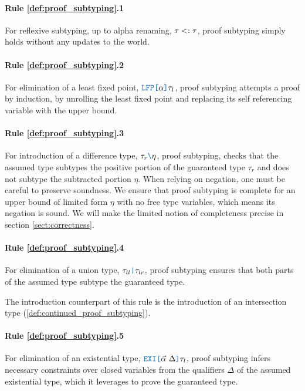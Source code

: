 \documentclass[acmsmall]{acmart}
\theoremstyle{definition}
\begin{document}
\paragraph{Rule \ref{def:proof_subtyping}.1}
For reflexive subtyping, up to alpha renaming, $\tau <: \tau$, 
proof subtyping simply holds without any updates to the world.

\paragraph{Rule \ref{def:proof_subtyping}.2}
For elimination of a least fixed point, $\obj{LFP[} \alpha \obj{]} \tau_l$, proof subtyping  
attempts a proof by induction, by unrolling the least fixed point
and replacing its self referencing variable with the upper bound.

\paragraph{Rule \ref{def:proof_subtyping}.3}
For introduction of a difference type, $\tau_r\obj{\textbackslash}\eta$, proof subtyping,
checks that the assumed type subtypes the positive portion of the guaranteed type $\tau_r$
and does not subtype the subtracted portion $\eta$.
When relying on negation, one must be careful to preserve soundness.
We ensure that proof subtyping is complete for an upper bound of limited
form $\eta$ with no free type variables, which
means its negation is sound. We will make the limited notion
of completeness precise in section \ref{sect:correctness}.

\paragraph{Rule \ref{def:proof_subtyping}.4}
For elimination of a union type, $\tau_{ll}\obj{|}\tau_{lr}$, proof subtyping
ensures that both parts of the assumed type subtype the guaranteed type.

The introduction counterpart of this rule is the introduction of an intersection type (\ref{def:continued_proof_subtyping}).

\paragraph{Rule \ref{def:proof_subtyping}.5}
For elimination of an existential type, $\obj{EXI[}\vec{\alpha}\ \Delta\obj{]}\tau_l$, proof subtyping 
infers necessary constraints over closed variables from the qualifiers $\Delta$ of the assumed existential type, 
which it leverages to prove the guaranteed type. 
\end{document}
